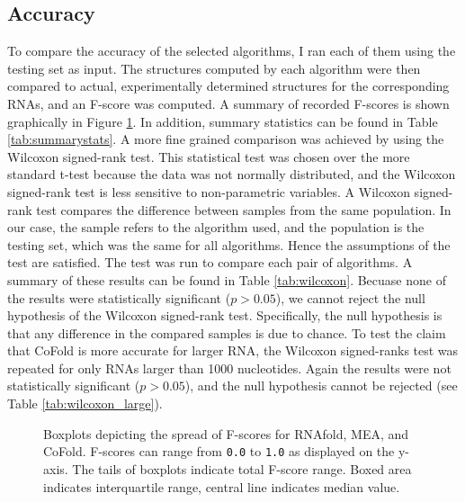\documentclass[12pt, a4paper]{article}
\begin{document}
\subsection{Accuracy}
To compare the accuracy of the selected algorithms, I ran each of them using the testing set as input. The structures computed by each algorithm were then compared to actual, experimentally determined structures for the corresponding RNAs, and an F-score was computed. A summary of recorded F-scores is shown graphically in Figure \ref{fig:boxplots}. In addition, summary statistics can be found in Table \ref{tab:summarystats}. A more fine grained comparison was achieved by using the Wilcoxon signed-rank test. This statistical test was chosen over the more standard t-test because the data was not normally distributed, and the Wilcoxon signed-rank test is less sensitive to non-parametric variables. A Wilcoxon signed-rank test compares the difference between samples from the same population. In our case, the sample refers to the algorithm used, and the population is the testing set, which was the same for all algorithms. Hence the assumptions of the test are satisfied. The test was run to compare each pair of algorithms. A summary of these results can be found in Table \ref{tab:wilcoxon}. Becuase none of the results were statistically significant ($p > 0.05$), we cannot reject the null hypothesis of the Wilcoxon signed-rank test. Specifically, the null hypothesis is that any difference in the compared samples is due to chance. To test the claim that CoFold is more accurate for larger RNA, the Wilcoxon signed-ranks test was repeated for only RNAs larger than 1000 nucleotides. Again the results were not statistically significant ($p > 0.05$), and the null hypothesis cannot be rejected (see Table \ref{tab:wilcoxon_large}).

\begin{figure}
\begin{center}
\end{center}
\caption{Boxplots depicting the spread of F-scores for RNAfold, MEA, and CoFold. F-scores can range from \texttt{0.0} to \texttt{1.0} as displayed on the y-axis. The tails of boxplots indicate total F-score range. Boxed area indicates interquartile range, central line indicates median value.}
\label{fig:boxplots}
\end{figure}
\end{document}
